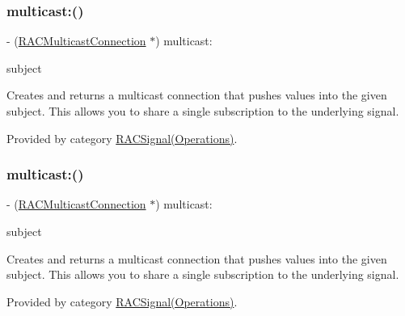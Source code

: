 \subsubsection{\texorpdfstring{multicast\+:()}{multicast:()}\hspace{0.1cm}{\footnotesize\ttfamily [2/3]}}
{\footnotesize\ttfamily -\/ (\mbox{\hyperlink{interface_r_a_c_multicast_connection}{R\+A\+C\+Multicast\+Connection}} $\ast$) multicast\+: \begin{DoxyParamCaption}\item[{(\mbox{\hyperlink{interface_r_a_c_subject}{R\+A\+C\+Subject}} $\ast$)}]{subject }\end{DoxyParamCaption}}

Creates and returns a multicast connection that pushes values into the given subject. This allows you to share a single subscription to the underlying signal. 

Provided by category \mbox{\hyperlink{category_r_a_c_signal_07_operations_08_a55b43f4fbef7e430a4587ce13eab18cb}{R\+A\+C\+Signal(\+Operations)}}.

\mbox{\label{interface_r_a_c_signal_a55b43f4fbef7e430a4587ce13eab18cb}} 
\subsubsection{\texorpdfstring{multicast\+:()}{multicast:()}\hspace{0.1cm}{\footnotesize\ttfamily [3/3]}}
{\footnotesize\ttfamily -\/ (\mbox{\hyperlink{interface_r_a_c_multicast_connection}{R\+A\+C\+Multicast\+Connection}} $\ast$) multicast\+: \begin{DoxyParamCaption}\item[{(\mbox{\hyperlink{interface_r_a_c_subject}{R\+A\+C\+Subject}} $\ast$)}]{subject }\end{DoxyParamCaption}}

Creates and returns a multicast connection that pushes values into the given subject. This allows you to share a single subscription to the underlying signal. 

Provided by category \mbox{\hyperlink{category_r_a_c_signal_07_operations_08_a55b43f4fbef7e430a4587ce13eab18cb}{R\+A\+C\+Signal(\+Operations)}}.

\mbox{\label{interface_r_a_c_signal_a53de1c418b57ee4c60d20f561db04717}} 
